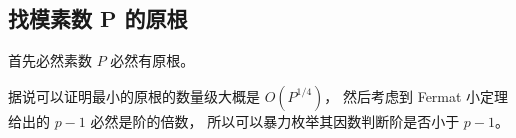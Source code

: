 \subsection{找模素数 P 的原根}

首先必然素数 $P$ 必然有原根。

据说可以证明最小的原根的数量级大概是 $O(P^{1/4})$，
然后考虑到 Fermat 小定理给出的 $p-1$ 必然是阶的倍数，
所以可以暴力枚举其因数判断阶是否小于 $p-1$。

